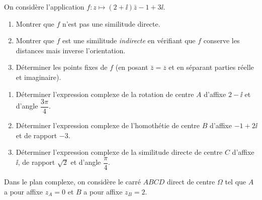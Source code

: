 
On considère l'application $f : z \mapsto (2 + \ii)\bar{z} - 1 + 3\ii$.

\begin{enumerate}
	\item Montrer que $f$ n'est pas une similitude directe.
	\item Montrer que $f$ est une similitude \emph{indirecte} en vérifiant que $f$
	conserve les distances mais inverse l'orientation.
	\item Déterminer les points fixes de $f$ (en posant $\bar{z} = \overline{z}$
	et en séparant parties réelle et imaginaire).
\end{enumerate}



\begin{enumerate}
	\item Déterminer l'expression complexe de la rotation de centre $A$ d'affixe
	$2 - \ii$ et d'angle $\dfrac{3\pi}{4}$.

	\item Déterminer l'expression complexe de l'homothétie de centre $B$ d'affixe
	$-1 + 2\ii$ et de rapport $-3$.

	\item Déterminer l'expression complexe de la similitude directe de centre $C$
	d'affixe $\ii$, de rapport $\sqrt{2}$ et d'angle $\dfrac{\pi}{4}$.
\end{enumerate}



Dans le plan complexe, on considère le carré $ABCD$ direct de centre $\Omega$
tel que $A$ a pour affixe $z_A = 0$ et $B$ a pour affixe $z_B = 2$.

